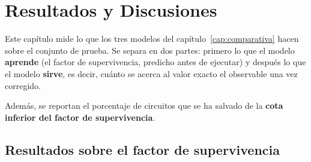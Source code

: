 \chapter{Resultados y Discusiones}
\label{cap:resultados}

%
%
%
%

Este capítulo mide lo que los tres modelos del capítulo~\ref{cap:comparativa} hacen sobre el
conjunto de prueba. Se separa en dos partes: primero lo que el
modelo \textbf{aprende} (el factor de supervivencia, predicho antes de ejecutar) y después lo
que el modelo \textbf{sirve}, es decir, cuánto se acerca al valor exacto el observable una vez
corregido.

Además, se reportan el porcentaje de circuitos que se ha salvado de la \textbf{cota inferior del factor de supervivencia}.


\section{Resultados sobre el factor de supervivencia}
\label{sec:res_factor}

